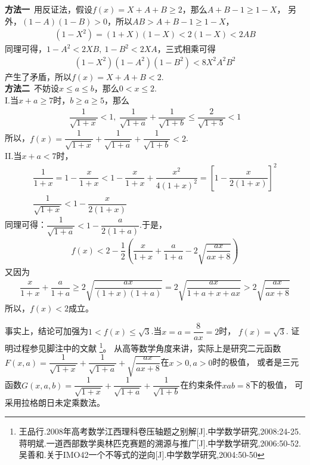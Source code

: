 \begin{enumerate}[label={【\textbf{例\thechapter.\arabic*}】},
 leftmargin=\inteval{\myenumleftmargin}pt,
 itemsep=\inteval{\myenumitempsep}pt,
 itemindent=\inteval{\myenumitemindent}pt]
\textbf{方法一}\ 用反证法，假设$ f(x)=X+A+B\geq 2 $，那么$ A+B-1\geq 1-X $，
另外，$ (1-A)(1-B)>0 $，所以$ AB>A+B-1\geq 1-X $，
\begin{align*}
    (1-X^2)=(1+X)(1-X)<2(1-X)<2AB
\end{align*}
同理可得，$ 1-A^2<2XB,\ 1-B^2<2XA $，三式相乘可得
\begin{align*}
    (1-X^2)(1-A^2)(1-B^2)<8X^2A^2B^2
\end{align*}
产生了矛盾，所以$ f(x)=X+A+B<2 $. \\
\textbf{方法二}\ 不妨设$ x\leq a\leq b $，那么$ 0<x\leq 2 $. \\
I.当$ x+a\geq 7 $时，$ b\geq a\geq 5 $，那么
\begin{gather*}
    \dfrac{1}{\sqrt{1+x}}<1,\ \dfrac{1}{\sqrt{1+a}}+\dfrac{1}{\sqrt{1+b}}\leq
    \dfrac{2}{\sqrt{1+5}}<1
\end{gather*}
所以，$ f(x)=\dfrac{1}{\sqrt{1+x}}+\dfrac{1}{\sqrt{1+a}}+\dfrac{1}{\sqrt{1+b}}<2 $. \\
II.当$ x+a<7 $时，
\begin{gather*}
    \dfrac{1}{1+x}=1-\dfrac{x}{1+x}<1-\dfrac{x}{1+x}+\dfrac{x^2}{4(1+x)^2}=\left[
    1-\dfrac{x}{2(1+x)}\right]^2 \\
    \dfrac{1}{\sqrt{1+x}}<1-\dfrac{x}{2(1+x)}
\end{gather*}
同理可得：$ \dfrac{1}{\sqrt{1+a}}<1-\dfrac{a}{2(1+a)} $.于是，
\begin{align*}
    f(x)<2-\dfrac{1}{2}\left(\dfrac{x}{1+x}+\dfrac{a}{1+a}-
    2\sqrt{\dfrac{ax}{ax+8}}\right)
\end{align*}
又因为
\begin{align*}
    \dfrac{x}{1+x}+\dfrac{a}{1+a}\geq 2\sqrt{\dfrac{ax}{(1+x)(1+a)}}
    =2\sqrt{\dfrac{ax}{1+a+x+ax}}>2\sqrt{\dfrac{ax}{ax+8}}
\end{align*}
所以，$ f(x)<2 $成立。

事实上，结论可加强为$ 1<f(x)\leq \sqrt{3} $.当$ x=a=\dfrac{8}{ax}=2 $时，
$ f(x)=\sqrt{3} $. 证明过程参见脚注中的文献
\footnote{王品行.2008年高考数学江西理科卷压轴题之别解[J].中学数学研究,2008:24-25.\\ 
蒋明斌.一道西部数学奥林匹克赛题的溯源与推广[J].中学数学研究,2006:50-52.\\
吴善和.关于IMO42一个不等式的逆向[J].中学数学研究,2004:50-50}。
从高等数学角度来讲，实际上是研究二元函数$ F(x,a)=\dfrac{1}{\sqrt{1+x}}+
\dfrac{1}{\sqrt{1+a}}+\sqrt{\dfrac{ax}{ax+8}} $在$ x>0,a>0 $时的极值，
或者是三元函数$ G(x,a,b)=\dfrac{1}{\sqrt{1+x}}+\dfrac{1}{\sqrt{1+a}}+
\dfrac{1}{\sqrt{1+b}} $在约束条件$ xab=8 $下的极值，
可采用拉格朗日未定乘数法。


\end{enumerate}
